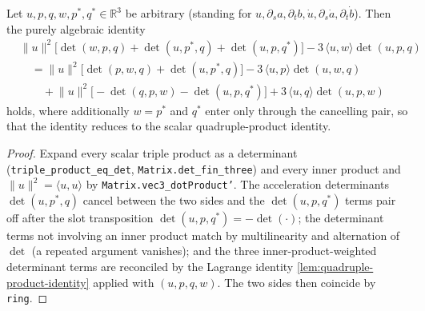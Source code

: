 \begin{lemma}
    \label{lem:divergence-algebraic-identity}
    Let $u,p,q,w,p^\ast,q^\ast\in\mathbb{R}^3$ be arbitrary (standing for
    $u,\partial_s a,\partial_t b,\dot u,\partial_s\dot a,\partial_t\dot b$). Then the
    purely algebraic identity
    \begin{align*}
        &\lVert u\rVert^{2}\bigl[\det(w,p,q)+\det(u,p^\ast,q)+\det(u,p,q^\ast)\bigr]
          -3\,\langle u,w\rangle\det(u,p,q) \\
        &\quad=\lVert u\rVert^{2}\bigl[\det(p,w,q)+\det(u,p^\ast,q)\bigr]
          -3\,\langle u,p\rangle\det(u,w,q) \\
        &\qquad+\lVert u\rVert^{2}\bigl[-\det(q,p,w)-\det(u,p,q^\ast)\bigr]
          +3\,\langle u,q\rangle\det(u,p,w)
    \end{align*}
    holds, where additionally $w=p^\ast$ and $q^\ast$ enter only through the cancelling
    pair, so that the identity reduces to the scalar quadruple-product identity.
\end{lemma}
\begin{proof}
    Expand every scalar triple product as a determinant
    (\texttt{triple\_product\_eq\_det}, \texttt{Matrix.det\_fin\_three}) and every
    inner product and $\lVert u\rVert^2=\langle u,u\rangle$ by
    \texttt{Matrix.vec3\_dotProduct'}. The acceleration determinants
    $\det(u,p^\ast,q)$ cancel between the two sides and the $\det(u,p,q^\ast)$ terms
    pair off after the slot transposition $\det(u,p,q^\ast)=-\det(\cdot)$; the
    determinant terms not involving an inner product match by multilinearity and
    alternation of $\det$ (a repeated argument vanishes); and the three
    inner-product-weighted determinant terms are reconciled by the Lagrange identity
    \cref{lem:quadruple-product-identity} applied with $(u,p,q,w)$. The two sides then
    coincide by \texttt{ring}.
\end{proof}

